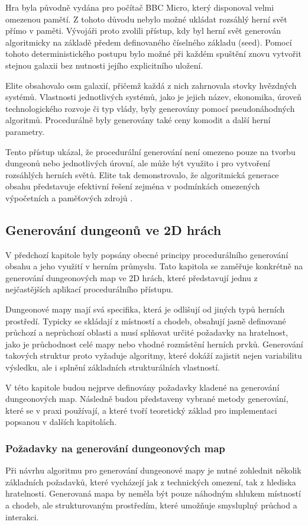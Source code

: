 \documentclass[
  program=itk,
  biblatex,
  figures=false,
  glossaries,
  index
]{kidiplom}
\begin{document}
Hra byla původně vydána pro počítač BBC Micro, který disponoval velmi omezenou pamětí. Z tohoto důvodu nebylo možné ukládat rozsáhlý herní svět přímo v paměti. Vývojáři proto zvolili přístup, kdy byl herní svět generován algoritmicky na základě předem definovaného číselného základu (seed). Pomocí tohoto deterministického postupu bylo možné při každém spuštění znovu vytvořit stejnou galaxii bez nutnosti jejího explicitního uložení.

Elite obsahovalo osm galaxií, přičemž každá z nich zahrnovala stovky hvězdných systémů. Vlastnosti jednotlivých systémů, jako je jejich název, ekonomika, úroveň technologického rozvoje či typ vlády, byly generovány pomocí pseudonáhodných algoritmů. Procedurálně byly generovány také ceny komodit a další herní parametry.

Tento přístup ukázal, že procedurální generování není omezeno pouze na tvorbu dungeonů nebo jednotlivých úrovní, ale může být využito i pro vytvoření rozsáhlých herních světů. Elite tak demonstrovalo, že algoritmická generace obsahu představuje efektivní řešení zejména v podmínkách omezených výpočetních a paměťových zdrojů \cite{EliteWiki}.

\subsection{Generování dungeonů ve 2D hrách}
V předchozí kapitole byly popsány obecné principy procedurálního generování obsahu a jeho využití v herním průmyslu. Tato kapitola se zaměřuje konkrétně na generování dungeonových map ve 2D hrách, které představují jednu z nejčastějších aplikací procedurálního přístupu.

Dungeonové mapy mají svá specifika, která je odlišují od jiných typů herních prostředí. Typicky se skládají z místností a chodeb, obsahují jasně definované průchozí a neprůchozí oblasti a musí splňovat určité požadavky na hratelnost, jako je průchodnost celé mapy nebo vhodné rozmístění herních prvků. Generování takových struktur proto vyžaduje algoritmy, které dokáží zajistit nejen variabilitu výsledku, ale i splnění základních strukturálních vlastností.

V této kapitole budou nejprve definovány požadavky kladené na generování dungeonových map. Následně budou představeny vybrané metody generování, které se v praxi používají, a které tvoří teoretický základ pro implementaci popsanou v dalších kapitolách.

\subsubsection{Požadavky na generování dungeonových map}
Při návrhu algoritmu pro generování dungeonové mapy je nutné zohlednit několik základních požadavků, které vycházejí jak z technických omezení, tak z hlediska hratelnosti. Generovaná mapa by neměla být pouze náhodným shlukem místností a chodeb, ale strukturovaným prostředím, které umožňuje smysluplný průchod a interakci.
\end{document}

